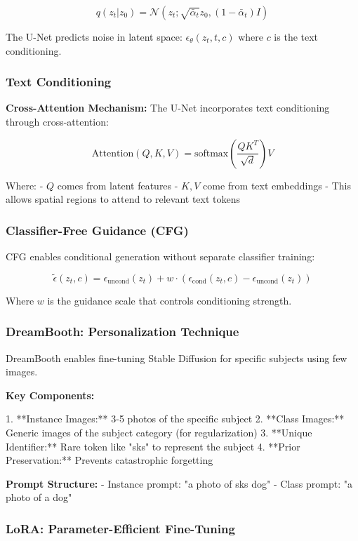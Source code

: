 \documentclass[a4paper,12pt]{article}
\begin{document}
\[ q(z_t | z_0) = \mathcal{N}(z_t; \sqrt{\bar{\alpha}_t} z_0, (1-\bar{\alpha}_t) I) \]

The U-Net predicts noise in latent space: $\epsilon_\theta(z_t, t, c)$ where $c$ is the text conditioning.

\subsubsection{Text Conditioning}

\textbf{Cross-Attention Mechanism:} The U-Net incorporates text conditioning through cross-attention:

\[ \text{Attention}(Q, K, V) = \text{softmax}\left(\frac{QK^T}{\sqrt{d}}\right) V \]

Where:
- $Q$ comes from latent features
- $K, V$ come from text embeddings
- This allows spatial regions to attend to relevant text tokens

\subsubsection{Classifier-Free Guidance (CFG)}

CFG enables conditional generation without separate classifier training:

\[ \tilde{\epsilon}(z_t, c) = \epsilon_\text{uncond}(z_t) + w \cdot (\epsilon_\text{cond}(z_t, c) - \epsilon_\text{uncond}(z_t)) \]

Where $w$ is the guidance scale that controls conditioning strength.

\subsubsection{DreamBooth: Personalization Technique}

DreamBooth enables fine-tuning Stable Diffusion for specific subjects using few images.

\textbf{Key Components:}

1. **Instance Images:** 3-5 photos of the specific subject
2. **Class Images:** Generic images of the subject category (for regularization)
3. **Unique Identifier:** Rare token like "sks" to represent the subject
4. **Prior Preservation:** Prevents catastrophic forgetting

\textbf{Prompt Structure:}
- Instance prompt: "a photo of sks dog"
- Class prompt: "a photo of a dog"

\subsubsection{LoRA: Parameter-Efficient Fine-Tuning}
\end{document}

